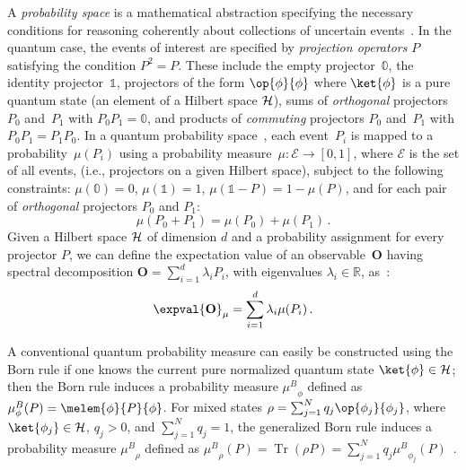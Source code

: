 \documentclass[english,reprint, aps, prl,superscriptaddress, showpacs,
showkeys, longbibliography, amsmath, amssymb, floatfix]{revtex4-1}
\theoremstyle{plain}
\theoremstyle{definition}
\newcommand{\events}{\ensuremath{\mathcal{E}}}
\newcommand{\proj}[1]{\op{#1}{#1}}
\newcommand{\Tr}{\ensuremath{\mathop{\mathrm{Tr}}\nolimits}}
\newcommand{\muB}{\ensuremath{\mu^{B}}}
\begin{document}
A \emph{probability space} is a mathematical abstraction specifying
the necessary conditions for reasoning coherently about collections of
uncertain
events~\cite{Kolmogorov1950bibTeX,544199,Griffiths2003,Grabisch2016}. In the
quantum case, the events of interest are specified by \emph{projection
  operators} $P$ satisfying the condition $P^2=P$. These include the
empty projector~$\mathbb{0}$, the identity projector~$\mathbb{1}$,
projectors of the form $\proj{\phi}$ where $\ket{\phi}$ is a pure
quantum state (an element of a Hilbert space ${\cal H}$), sums of
\emph{orthogonal} projectors~$P_0$ and~$P_1$ with $P_0P_1=\mathbb{0}$,
and products of \emph{commuting} projectors $P_0$ and~$P_1$ with
$P_0P_1=P_1P_0$. In a quantum probability
space~\cite{10.2307/2308516,gleason1957,Redhead1987-REDINA,Maassen2010,Abramsky2012},
each event~$P_{i}$ is mapped to a probability~$\mu(P_{i})$ using a
probability measure~$\mu:\events\rightarrow[0,1]$, where $\events$ is
the set of all events, (i.e., projectors on a given Hilbert space), %
subject to the 
following constraints: $\mu(\mathbb{0})=0$, $\mu(\mathbb{1})=1$,
$\mu\left(\mathbb{1}-P\right)=1-\mu\left(P\right)$, and for each pair
of \emph{orthogonal} projectors $P_{0}$ and $P_{1}$:
\begin{equation}
{\mu}\left(P_{0}+P_{1}\right)={\mu}\left(P_{0}\right)+{\mu}\left(P_{1}\right)\,.\label{eq:QuantumProbability-Addition}
\end{equation}
Given a Hilbert space ${\cal H}$ of dimension $d$ and a probability assignment
for every projector $P$, we can define the expectation value of an
observable~$\mathbf{O}$ having spectral decomposition
$\mathbf{O}=\sum_{i=1}^{d}\lambda_{i}P_{i}$, with eigenvalues $\lambda_i \in
\mathbb{R}$, as~\cite{544199,Jaeger2007}:
\begin{equation}
\expval{\mathbf{O}}_{\mu}=\sum_{i=1}^{d}\lambda_{i}\mu(P_{i})\,.\label{eq:quantum-expectation}
\end{equation}

A conventional quantum probability measure can easily be constructed
using the Born rule if one knows the current pure normalized quantum
state $\ket{\phi} \in {\cal H}$; then the Born rule induces a
probability measure $\muB_{\phi}$ defined as
$\muB_{\phi}(P)=\melem{\phi}{P}{\phi}$. For mixed states
$\rho = \sum_{j=1}^{N}q_{j}\proj{\phi_{j}}$, where
$\ket{\phi_j} \in {\cal H}$, $q_j > 0$, and $\sum_{j=1}^{N}q_{j}=1$,
the generalized Born rule induces a probability measure $\muB_{\rho}$
defined as
$\muB_{\rho}\left(P\right) = \Tr\left(\rho P\right) = \sum_{j=1}^{N}
q_{j}\muB_{\phi_{j}}\left(P\right)$~\cite{Born1983bibTeX,Mermin2007,Jaeger2007}.
\end{document}
